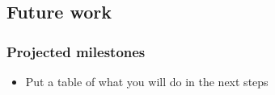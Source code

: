 \documentclass{beamer}
\begin{document}
\subsection[Future]{Future work}
\begin{frame}[allowframebreaks]
\frametitle{Projected milestones}
\begin{itemize}
\item Put a table of what you will do in the next steps
\end{itemize}
\end{frame}





%
%
%
%
%
%
%
%
%
%
%
\end{document}
